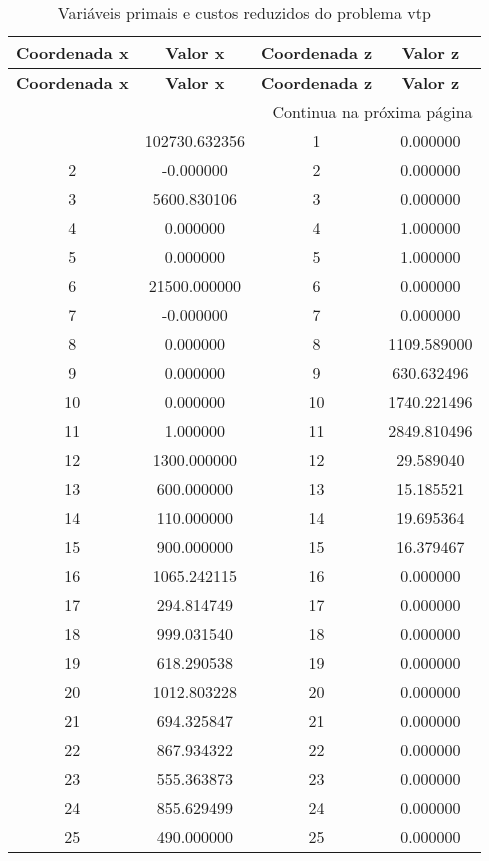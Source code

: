 \documentclass[12pt]{article}
\begin{document}
\begin{longtable}{@{}cccc@{}}
\caption{Variáveis primais e custos reduzidos do problema vtp} \\
\toprule
\textbf{Coordenada x} & \textbf{Valor x} & \textbf{Coordenada z} & \textbf{Valor z} \\
\midrule
\endfirsthead

\toprule
\textbf{Coordenada x} & \textbf{Valor x} & \textbf{Coordenada z} & \textbf{Valor z} \\
\midrule
\endhead

\midrule \multicolumn{4}{r}{{Continua na próxima página}} \\ \midrule
\endfoot

\bottomrule
\endlastfoot
1 & 102730.632356 & 1 & 0.000000 \\
2 & -0.000000 & 2 & 0.000000 \\
3 & 5600.830106 & 3 & 0.000000 \\
4 & 0.000000 & 4 & 1.000000 \\
5 & 0.000000 & 5 & 1.000000 \\
6 & 21500.000000 & 6 & 0.000000 \\
7 & -0.000000 & 7 & 0.000000 \\
8 & 0.000000 & 8 & 1109.589000 \\
9 & 0.000000 & 9 & 630.632496 \\
10 & 0.000000 & 10 & 1740.221496 \\
11 & 1.000000 & 11 & 2849.810496 \\
12 & 1300.000000 & 12 & 29.589040 \\
13 & 600.000000 & 13 & 15.185521 \\
14 & 110.000000 & 14 & 19.695364 \\
15 & 900.000000 & 15 & 16.379467 \\
16 & 1065.242115 & 16 & 0.000000 \\
17 & 294.814749 & 17 & 0.000000 \\
18 & 999.031540 & 18 & 0.000000 \\
19 & 618.290538 & 19 & 0.000000 \\
20 & 1012.803228 & 20 & 0.000000 \\
21 & 694.325847 & 21 & 0.000000 \\
22 & 867.934322 & 22 & 0.000000 \\
23 & 555.363873 & 23 & 0.000000 \\
24 & 855.629499 & 24 & 0.000000 \\
25 & 490.000000 & 25 & 0.000000 \\

\end{longtable}
\end{document}
